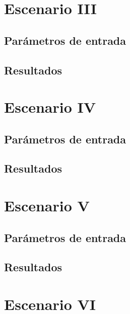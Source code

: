 \section{Escenario III}
\subsection{Parámetros de entrada}
\subsection{Resultados}


\section{Escenario IV}
\subsection{Parámetros de entrada}
\subsection{Resultados}


\section{Escenario V}
\subsection{Parámetros de entrada}
\subsection{Resultados}


\section{Escenario VI}
